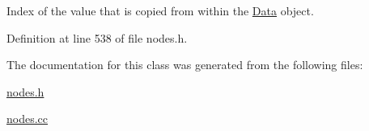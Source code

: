 Index of the value that is copied from within the \hyperlink{classoomph_1_1Data}{Data} object. 



Definition at line 538 of file nodes.\+h.



The documentation for this class was generated from the following files\+:\begin{DoxyCompactItemize}
\item 
\hyperlink{nodes_8h}{nodes.\+h}\item 
\hyperlink{nodes_8cc}{nodes.\+cc}\end{DoxyCompactItemize}
